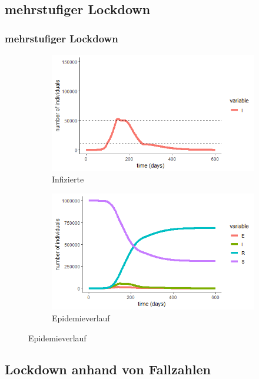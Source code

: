 \documentclass{beamer}
\begin{document}
\subsection{mehrstufiger Lockdown}
\begin{frame}
	\frametitle{mehrstufiger Lockdown}
	\begin{figure}
        \centering
        \begin{subfigure}[b]{0.495\textwidth}
            \centering
            \includegraphics[width=\textwidth]{thres2-I}
		\caption{Infizierte}
        \end{subfigure}
        \hfill
        \begin{subfigure}[b]{0.495\textwidth}  
            \centering 
            \includegraphics[width=\textwidth]{thres2-epi}
		\caption{Epidemieverlauf}
        \end{subfigure}
	\end{figure}

\end{frame}
\subsection{Lockdown anhand von Fallzahlen}
\end{document}
